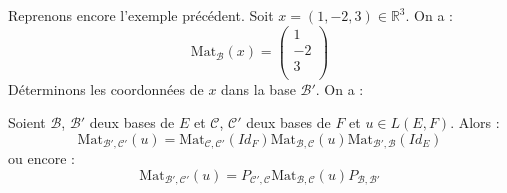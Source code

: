 \documentclass[a4paper,10pt]{report}
\begin{document}

\begin{ex} Reprenons encore l'exemple précédent. Soit $x=(1,-2,3) \in \mathbb{R}^3$. On a :
$$ \textrm{Mat}_{\mathcal{B}}(x) = \begin{pmatrix}
1 \\
-2 \\
3 \\
\end{pmatrix}$$
Déterminons les coordonnées de $x$ dans la base $\mathcal{B}'$. On a :

\vspace{4cm}
\end{ex}

\begin{thm} Soient $\mathcal{B}$, $\mathcal{B}'$ deux bases de $E$ et $\mathcal{C}$, $\mathcal{C}'$ deux bases de $F$ et $u \in L(E,F)$. Alors :
$$ \textrm{Mat}_{\mathcal{B}', \mathcal{C}'}(u) = \textrm{Mat}_{\mathcal{C}, \mathcal{C}'}(Id_F)  \textrm{Mat}_{\mathcal{B}, \mathcal{C}}(u) \textrm{Mat}_{\mathcal{B}', \mathcal{B}}(Id_E)$$
ou encore :
$$ \textrm{Mat}_{\mathcal{B}', \mathcal{C}'}(u) = P_{\mathcal{C}', \mathcal{C}}  \textrm{Mat}_{\mathcal{B}, \mathcal{C}}(u)  P_{\mathcal{B}, \mathcal{B}'}$$
\end{thm}
\end{document}
